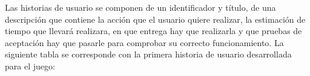 \begin{comment}
      \hline
      HU7
      & Acceder al menú de anotaciones
      & 2
      & 6
      & 3\\

      \hline
      HU8
      & Marcar personaje con una interrogación
      & 2
      & 6
      & 3\\

      \hline
      HU9
      & Marcar arma con una interrogación
      & 1
      & 6
      & 3\\

      \hline
      HU10
      & Marcar habitación con una interrogación
      & 1
      & 6
      & 3\\

      \hline
      HU11
      & Marcar personaje con una X
      & 2
      & 6
      & 3\\

      \hline
      HU12
      & Marcar arma con una X
      & 1
      & 6
      & 3\\

      \hline
      HU13
      & Marcar habitación con una X
      & 1
      & 6
      & 3\\

      \hline
      HU14
      & Escanear una acusación
      & 8
      & 7
      & 3\\

      \hline
      HU15
      & Terminar partida
      & 2
      & 4
      & 2\\

      \hline
      HU16
      & Cambiar de turno
      & 1
      & 8
      & 4\\

      \hline

    \end{tabular}

    \caption{Listado del Product Backlog.}
    \label{tabla-product-backlog}

  \end{center}
\end{table}

\end{comment}

Las historias de usuario se componen de un identificador y título, de una descripción que contiene la acción que el usuario quiere realizar, la estimación de tiempo que llevará realizara, en que entrega hay que realizarla y que pruebas de aceptación hay que pasarle para comprobar su correcto funcionamiento. La siguiente tabla se corresponde con la primera historia de usuario desarrollada para el juego:

